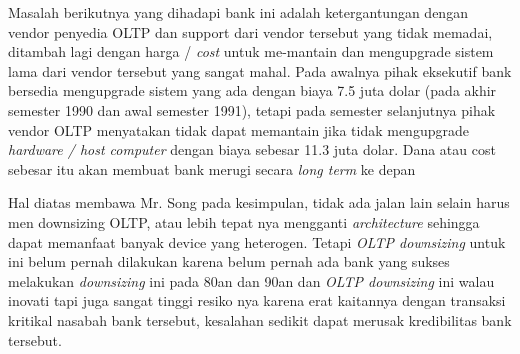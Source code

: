 \documentclass[12pt]{article}
\begin{document}
Masalah berikutnya yang dihadapi bank ini adalah ketergantungan dengan vendor penyedia OLTP dan support dari vendor tersebut yang tidak memadai, ditambah lagi dengan harga / \emph{cost} untuk me-mantain  dan mengupgrade sistem lama dari vendor tersebut yang sangat mahal. Pada awalnya pihak eksekutif bank bersedia mengupgrade sistem yang ada dengan biaya 7.5 juta dolar (pada akhir semester 1990 dan awal semester 1991), tetapi pada semester selanjutnya pihak vendor OLTP menyatakan tidak dapat memantain jika tidak mengupgrade \emph{hardware / host computer}  dengan biaya sebesar 11.3 juta dolar. Dana atau cost sebesar itu akan membuat bank merugi secara \emph{long term} ke depan

Hal diatas membawa Mr. Song pada kesimpulan, tidak ada jalan lain selain harus men downsizing OLTP, atau lebih tepat nya mengganti \emph{architecture} sehingga dapat memanfaat banyak device yang heterogen. Tetapi \emph{OLTP downsizing} untuk ini belum pernah dilakukan karena belum pernah ada bank yang sukses melakukan \emph{downsizing} ini pada 80an dan 90an dan \emph{OLTP downsizing} ini walau inovati tapi juga sangat tinggi resiko nya karena erat kaitannya dengan transaksi kritikal nasabah bank tersebut, kesalahan sedikit dapat merusak kredibilitas bank tersebut. 





\end{document}
